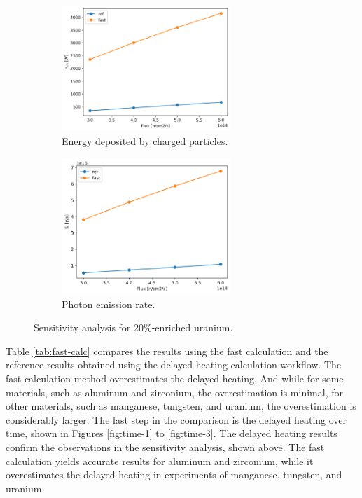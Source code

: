 \begin{figure}[htbp!] %
  \centering
  \begin{subfigure}[b]{0.49\textwidth}
    \centering
    \includegraphics[width=0.7\textwidth]{figures/fast-res92_4_4_hch}
    \caption{Energy deposited by charged particles.}
  \end{subfigure}
  \hfill
  \begin{subfigure}[b]{0.49\textwidth}
    \centering
    \includegraphics[width=0.7\textwidth]{figures/fast-res92_4_4_Si}
    \caption{Photon emission rate.}
  \end{subfigure}
  \hfill
  \caption{Sensitivity analysis for 20\%-enriched uranium.}
  \label{fig:sens-u}
\end{figure}

Table \ref{tab:fast-calc} compares the results using the fast calculation and the reference results obtained using the delayed heating calculation workflow.
The fast calculation method overestimates the delayed heating.
And while for some materials, such as aluminum and zirconium, the overestimation is minimal, for other materials, such as manganese, tungsten, and uranium, the overestimation is considerably larger.
The last step in the comparison is the delayed heating over time, shown in Figures \ref{fig:time-1} to \ref{fig:time-3}.
The delayed heating results confirm the observations in the sensitivity analysis, shown above.
The fast calculation yields accurate results for aluminum and zirconium, while it overestimates the delayed heating in experiments of manganese, tungsten, and uranium.


